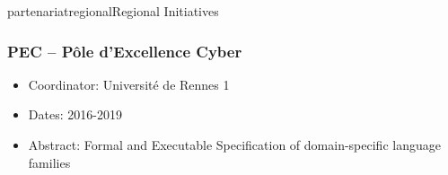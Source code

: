 \documentclass{ra2018}
\begin{document}
\begin{module}{partenariat}{regional}{Regional Initiatives}

\subsubsection*{PEC -- Pôle d'Excellence Cyber}

\begin{itemize}
	\item Coordinator: Universit\'e de Rennes 1
	\item Dates: 2016-2019
	\item Abstract: Formal and Executable Specification of domain-specific language families
\end{itemize}

\end{module}
\end{document}
